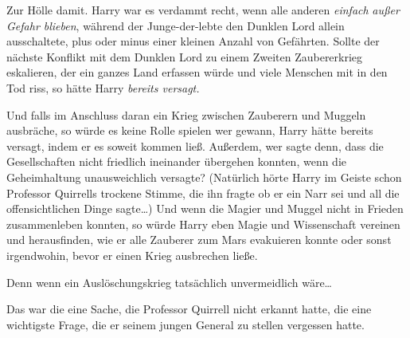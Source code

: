 Zur Hölle damit. Harry war es verdammt recht, wenn alle anderen \emph{einfach} \emph{außer Gefahr blieben}, während der Junge-der-lebte den Dunklen Lord allein ausschaltete, plus oder minus einer kleinen Anzahl von Gefährten. Sollte der nächste Konflikt mit dem Dunklen Lord zu einem Zweiten Zaubererkrieg eskalieren, der ein ganzes Land erfassen würde und viele Menschen mit in den Tod riss, so hätte Harry \emph{bereits versagt.}

Und falls im Anschluss daran ein Krieg zwischen Zauberern und Muggeln ausbräche, so würde es keine Rolle spielen wer gewann, Harry hätte bereits versagt, indem er es soweit kommen ließ. Außerdem, wer sagte denn, dass die Gesellschaften nicht friedlich ineinander übergehen konnten, wenn die Geheimhaltung unausweichlich versagte? (Natürlich hörte Harry im Geiste schon Professor Quirrells trockene Stimme, die ihn fragte ob er ein Narr sei und all die offensichtlichen Dinge sagte…) Und wenn die Magier und Muggel nicht in Frieden zusammenleben konnten, so würde Harry eben Magie und Wissenschaft vereinen und herausfinden, wie er alle Zauberer zum Mars evakuieren konnte oder sonst irgendwohin, bevor er einen Krieg ausbrechen ließe.%

Denn wenn ein Auslöschungskrieg tatsächlich unvermeidlich wäre…

Das war die eine Sache, die Professor Quirrell nicht erkannt hatte, die eine wichtigste Frage, die er seinem jungen General zu stellen vergessen hatte.

